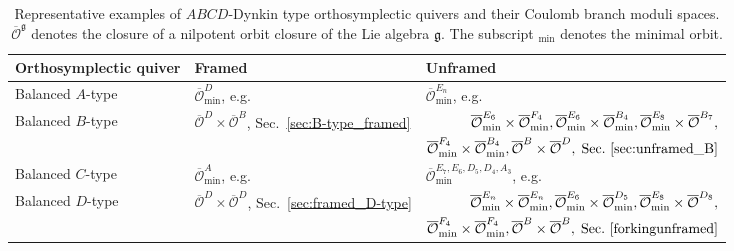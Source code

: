 \documentclass[a4paper,11pt]{article}
\newcommand{\ra}[1]{\renewcommand{\arraystretch}{#1}}
\begin{document}
\begin{table}[ht]
    \centering
    \ra{2.5}
    \begin{tabular}{lll}
    \toprule
    Orthosymplectic quiver & Framed & Unframed \\\midrule
    Balanced $A$-type &  $\overline{\mathcal{O}}_{\min}^{D}$, e.g.\  \cite{Feng:2000eq}  &
      $\overline{\mathcal{O}}_{\min}^{E_n}$, e.g.\ \cite{Bourget:2020gzi} \\
    Balanced $B$-type & $\overline{\mathcal{O}}^{D}\times \overline{\mathcal{O}}^{B}$, Sec.\ \ref{sec:B-type_framed} & $\begin{aligned}
    \overline{\mathcal{O}}_{\min}^{E_6}\times \overline{\mathcal{O}}_{\min}^{F_4} ,\overline{\mathcal{O}}_{\min}^{E_6}\times \overline{\mathcal{O}}_{\min}^{B_4},
    \overline{\mathcal{O}}_{\min}^{E_8}\times \overline{\mathcal{O}}^{B_7}, \\
    \overline{\mathcal{O}}_{\min}^{F_4}\times \overline{\mathcal{O}}_{\min}^{B_4},
    \overline{\mathcal{O}}^{B}\times \overline{\mathcal{O}}^{D} , \; 
    \text{Sec.\ \ref{sec:unframed_B}}
    \end{aligned}$
    \\
    Balanced $C$-type &  $\overline{\mathcal{O}}_{\min}^{A}$, e.g.\ \cite{Bourget:2021xex} & $\overline{\mathcal{O}}_{\min}^{E_7,E_6,D_5,D_4,A_3}$, e.g.\ \cite{Bourget:2021xex}  \\
    Balanced $D$-type & $\overline{\mathcal{O}}^{D}\times \overline{\mathcal{O}}^{D}$, Sec.\ \ref{sec:framed_D-type} &
    $\begin{aligned}
    \overline{\mathcal{O}}_{\min}^{E_n}\times \overline{\mathcal{O}}_{\min}^{E_n} ,\overline{\mathcal{O}}_{\min}^{E_6}\times \overline{\mathcal{O}}_{\min}^{D_5},
    \overline{\mathcal{O}}_{\min}^{E_8}\times \overline{\mathcal{O}}^{D_8}, \\
    \overline{\mathcal{O}}_{\min}^{F_4}\times \overline{\mathcal{O}}_{\min}^{F_4},
    \overline{\mathcal{O}}^{B}\times \overline{\mathcal{O}}^{B} , \; 
    \text{Sec.\ \ref{forkingunframed}}
    \end{aligned}$
     \\ \bottomrule
    \end{tabular}
    \caption{Representative examples of $ABCD$-Dynkin type orthosymplectic quivers and their Coulomb branch moduli spaces. $\overline{\mathcal{O}}^{\mathfrak{g}}$ denotes the closure of a nilpotent orbit closure of the Lie algebra $\mathfrak{g}$. The subscript ${}_{\min}$ denotes the minimal orbit. }
    \label{tab:results}
\end{table}
\end{document}

